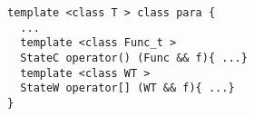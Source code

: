   \begin{lstlisting}[mathescape]
  template <class T > class para {
  ...
  template <class Func_t >
  StateC operator() (Func && f){ ...}
  template <class WT >
  StateW operator[] (WT && f){ ...}
}
  \end{lstlisting}
